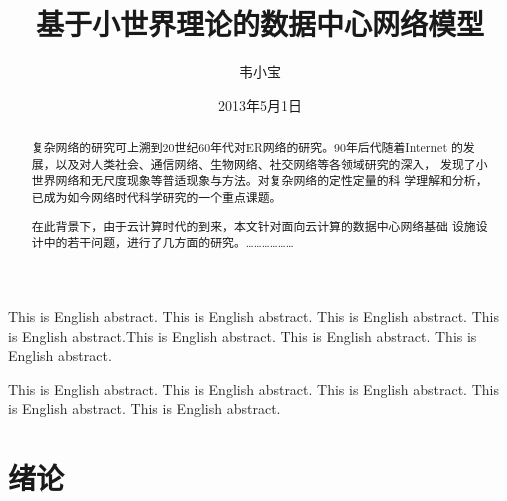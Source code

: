 \documentclass[oneside, phd]{njuthesis}
\title{基于小世界理论的数据中心网络模型}
\author{韦小宝}
\institute{南京大学}
\date{2013年5月1日}
\begin{document}
\maketitle

\makeenglishtitle

\frontmatter

\begin{abstract}

复杂网络的研究可上溯到20世纪60年代对ER网络的研究。90年后代随着Internet
的发展，以及对人类社会、通信网络、生物网络、社交网络等各领域研究的深入，
发现了小世界网络和无尺度现象等普适现象与方法。对复杂网络的定性定量的科
学理解和分析，已成为如今网络时代科学研究的一个重点课题。

在此背景下，由于云计算时代的到来，本文针对面向云计算的数据中心网络基础
设施设计中的若干问题，进行了几方面的研究。………………

\end{abstract}

\begin{englishabstract}
This is English abstract. This is English abstract. This is English
abstract. This is English abstract.This is English abstract. This is English
abstract. This is English abstract.

This is English abstract. This is English abstract. This is English
abstract. This is English abstract. This is English abstract.

\end{englishabstract}

\tableofcontents

\listoftables
\listoffigures

\mainmatter

\chapter{绪论}\label{chapter_introduction}
\end{document}

